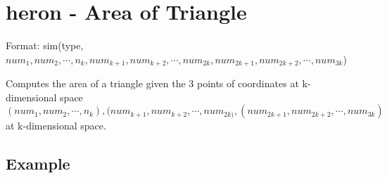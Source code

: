 
%

\section{heron - Area of Triangle\label{sect:heron}}

Format: sim(type,$num_1,num_2,\cdots,n_k,num_{k+1},num_{k+2},\cdots,num_{2k},num_{2k+1},num_{2k+2},\cdots,num_{3k}$)

Computes the area of a triangle given the 3 points of coordinates  at k-dimensional space $(num_1,num_2,\cdots,n_k),(num_{k+1}, num_{k+2},\cdots,num_{2k)}
,(num_{2k+1},num_{2k+2},\cdots,num_{3k})$ at k-dimensional space. 

\subsection*{Example}


%
